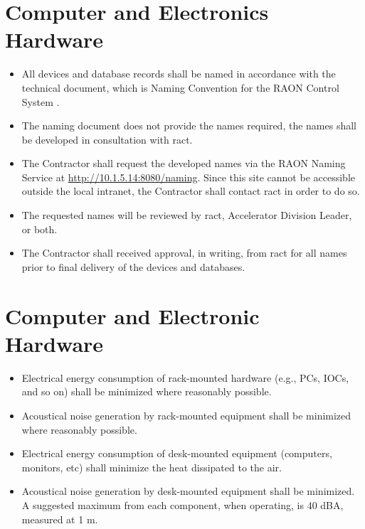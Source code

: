 \documentclass[11pt
  , a4paper
  , article
  , oneside
]{memoir}
\begin{document}
\section{Computer and Electronics Hardware}
\begin{itemize}
  \item All devices and database records shall be named in accordance with the technical document, which is Naming Convention for the RAON Control System \cite{raon-naming-convention}.
  \item The naming document \cite{raon-naming-convention} does not provide the names required, the names shall be developed in consultation with \Gls{ract}. 
  \item The Contractor shall request the developed names via the RAON Naming Service at \url{http://10.1.5.14:8080/naming}. Since this site cannot be accessible outside the local intranet, the Contractor shall contact \Gls{ract} in order to do so.
  \item The requested names will be reviewed by \Gls{ract}, Accelerator Division Leader, or both. 
  \item The Contractor shall received approval, in writing, from \Gls{ract} for all names prior to final delivery of the devices and databases. 
\end{itemize}


\section{Computer and Electronic Hardware}
\begin{itemize}
  \item Electrical energy consumption of rack-mounted hardware (e.g., PCs, IOCs, and so on) shall be minimized where reasonably possible.
  \item Acoustical noise generation by rack-mounted equipment shall be minimized where reasonably possible.
  \item Electrical energy consumption of desk-mounted equipment (computers, monitors, etc) shall minimize the heat dissipated to the air.
  \item Acoustical noise generation by desk-mounted equipment shall be minimized. A suggested maximum from each component, when operating, is 40 dBA, measured at 1 m.
\end{itemize}
\end{document}
